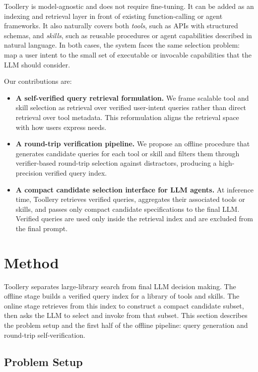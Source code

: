 Toollery is model-agnostic and does not require fine-tuning. It can be added as an indexing and retrieval layer in front of existing function-calling or agent frameworks. It also naturally covers both \emph{tools}, such as APIs with structured schemas, and \emph{skills}, such as reusable procedures or agent capabilities described in natural language. In both cases, the system faces the same selection problem: map a user intent to the small set of executable or invocable capabilities that the LLM should consider.

Our contributions are:
\begin{itemize}
    \item \textbf{A self-verified query retrieval formulation.} We frame scalable tool and skill selection as retrieval over verified user-intent queries rather than direct retrieval over tool metadata. This reformulation aligns the retrieval space with how users express needs.
    \item \textbf{A round-trip verification pipeline.} We propose an offline procedure that generates candidate queries for each tool or skill and filters them through verifier-based round-trip selection against distractors, producing a high-precision verified query index.
    \item \textbf{A compact candidate selection interface for LLM agents.} At inference time, Toollery retrieves verified queries, aggregates their associated tools or skills, and passes only compact candidate specifications to the final LLM. Verified queries are used only inside the retrieval index and are excluded from the final prompt.
\end{itemize}

\section{Method}
\label{sec:method}

Toollery separates large-library search from final LLM decision making. The offline stage builds a verified query index for a library of tools and skills. The online stage retrieves from this index to construct a compact candidate subset, then asks the LLM to select and invoke from that subset. This section describes the problem setup and the first half of the offline pipeline: query generation and round-trip self-verification.

\subsection{Problem Setup}
\label{sec:problem_setup}

